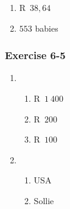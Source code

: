 {\begin{multicols}{3}
\begin{enumerate}[label=\textbf{\arabic*}.]
	\item R~$38,64$%

	\item $553$ babies%
    \end{enumerate}


\subsubsection*{Exercise 6-5} %

    \begin{enumerate}[noitemsep, label=\textbf{\arabic*}.]
	\item %
	\begin{enumerate}[noitemsep, label=\textbf{(\alph*)} ]
	    \item R~$1~400$%
	    \item R~$200$%
	    \item R~$100$%
	\end{enumerate}

	\item %
	
	\begin{enumerate}[noitemsep, label=\textbf{(\alph*)} ]
	    \item USA %

	    \item Sollie %
	\end{enumerate}
    \end{enumerate}




\end{multicols}}
